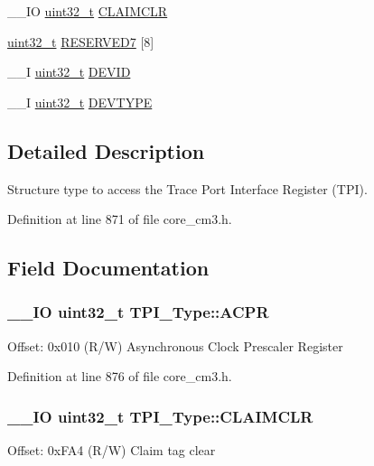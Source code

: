 \begin{DoxyCompactItemize}
\item 
\-\_\-\-\_\-\-I\-O \hyperlink{stdint_8h_a435d1572bf3f880d55459d9805097f62}{uint32\-\_\-t} \hyperlink{struct_t_p_i___type_a44efa6045512c8d4da64b0623f7a43ad}{C\-L\-A\-I\-M\-C\-L\-R}
\item 
\hyperlink{stdint_8h_a435d1572bf3f880d55459d9805097f62}{uint32\-\_\-t} \hyperlink{struct_t_p_i___type_a58e6780b937267874964fb3efa9b96c7}{R\-E\-S\-E\-R\-V\-E\-D7} \mbox{[}8\mbox{]}
\item 
\-\_\-\-\_\-\-I \hyperlink{stdint_8h_a435d1572bf3f880d55459d9805097f62}{uint32\-\_\-t} \hyperlink{struct_t_p_i___type_a4b2e0d680cf7e26728ca8966363a938d}{D\-E\-V\-I\-D}
\item 
\-\_\-\-\_\-\-I \hyperlink{stdint_8h_a435d1572bf3f880d55459d9805097f62}{uint32\-\_\-t} \hyperlink{struct_t_p_i___type_a16d12c5b1e12f764fa3ec4a51c5f0f35}{D\-E\-V\-T\-Y\-P\-E}
\end{DoxyCompactItemize}


\subsection{Detailed Description}
Structure type to access the Trace Port Interface Register (T\-P\-I). 

Definition at line 871 of file core\-\_\-cm3.\-h.



\subsection{Field Documentation}
\hypertarget{struct_t_p_i___type_ad75832a669eb121f6fce3c28d36b7fab}{
\subsubsection[{A\-C\-P\-R}]{\setlength{\rightskip}{0pt plus 5cm}\-\_\-\-\_\-\-I\-O {\bf uint32\-\_\-t} T\-P\-I\-\_\-\-Type\-::\-A\-C\-P\-R}}\label{struct_t_p_i___type_ad75832a669eb121f6fce3c28d36b7fab}
Offset\-: 0x010 (R/\-W) Asynchronous Clock Prescaler Register 

Definition at line 876 of file core\-\_\-cm3.\-h.

\hypertarget{struct_t_p_i___type_a44efa6045512c8d4da64b0623f7a43ad}{
\subsubsection[{C\-L\-A\-I\-M\-C\-L\-R}]{\setlength{\rightskip}{0pt plus 5cm}\-\_\-\-\_\-\-I\-O {\bf uint32\-\_\-t} T\-P\-I\-\_\-\-Type\-::\-C\-L\-A\-I\-M\-C\-L\-R}}\label{struct_t_p_i___type_a44efa6045512c8d4da64b0623f7a43ad}
Offset\-: 0x\-F\-A4 (R/\-W) Claim tag clear 

